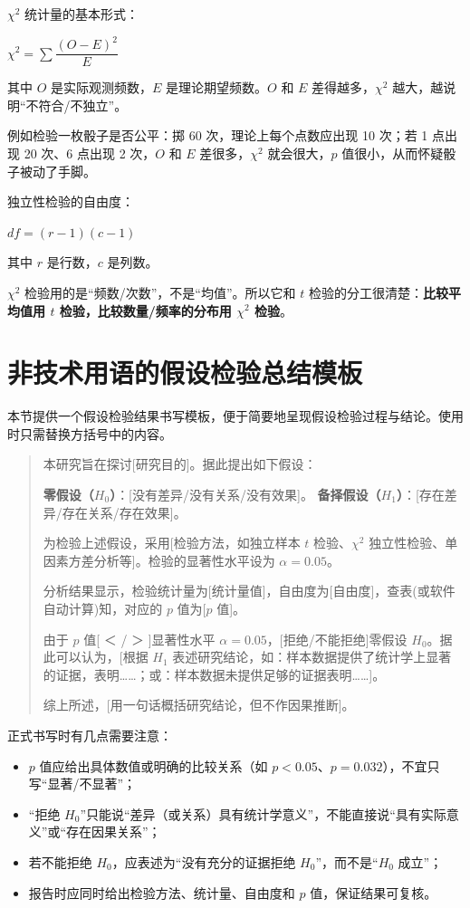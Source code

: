 \documentclass[lang=cn,10pt]{elegantbook}
\begin{document}
$\chi^2$ 统计量的基本形式：
\begin{center}
$\chi^2=\sum\dfrac{(O-E)^2}{E}$
\end{center}
其中 $O$ 是实际观测频数，$E$ 是理论期望频数。$O$ 和 $E$ 差得越多，$\chi^2$ 越大，越说明“不符合/不独立”。

例如检验一枚骰子是否公平：掷 60 次，理论上每个点数应出现 10 次；若 1 点出现 20 次、6 点出现 2 次，$O$ 和 $E$ 差很多，$\chi^2$ 就会很大，$p$ 值很小，从而怀疑骰子被动了手脚。

独立性检验的自由度：
\begin{center}
$df=(r-1)(c-1)$
\end{center}
其中 $r$ 是行数，$c$ 是列数。

\begin{remark}
$\chi^2$ 检验用的是“频数/次数”，不是“均值”。所以它和 $t$ 检验的分工很清楚：\textbf{比较平均值用 $t$ 检验，比较数量/频率的分布用 $\chi^2$ 检验}。
\end{remark}

\section{非技术用语的假设检验总结模板}
本节提供一个假设检验结果书写模板，便于简要地呈现假设检验过程与结论。使用时只需替换方括号中的内容。

\begin{quote}
本研究旨在探讨[研究目的]。据此提出如下假设：

\textbf{零假设（$H_0$）}：[没有差异/没有关系/没有效果]。
\textbf{备择假设（$H_1$）}：[存在差异/存在关系/存在效果]。

为检验上述假设，采用[检验方法，如独立样本 $t$ 检验、$\chi^2$ 独立性检验、单因素方差分析等]。检验的显著性水平设为 $\alpha=0.05$。

分析结果显示，检验统计量为[统计量值]，自由度为[自由度]，查表(或软件自动计算)知，对应的 $p$ 值为[$p$ 值]。

由于 $p$ 值[ ＜ / ＞ ]显著性水平 $\alpha=0.05$，[拒绝/不能拒绝]零假设 $H_0$。据此可以认为，[根据 $H_1$ 表述研究结论，如：样本数据提供了统计学上显著的证据，表明……；或：样本数据未提供足够的证据表明……]。

综上所述，[用一句话概括研究结论，但不作因果推断]。
\end{quote}

\begin{remark}
正式书写时有几点需要注意：
\begin{itemize}
  \item $p$ 值应给出具体数值或明确的比较关系（如 $p<0.05$、$p=0.032$），不宜只写“显著/不显著”；
  \item “拒绝 $H_0$”只能说“差异（或关系）具有统计学意义”，不能直接说“具有实际意义”或“存在因果关系”；
  \item 若不能拒绝 $H_0$，应表述为“没有充分的证据拒绝 $H_0$”，而不是“$H_0$ 成立”；
  \item 报告时应同时给出检验方法、统计量、自由度和 $p$ 值，保证结果可复核。
\end{itemize}
\end{remark}
\end{document}
